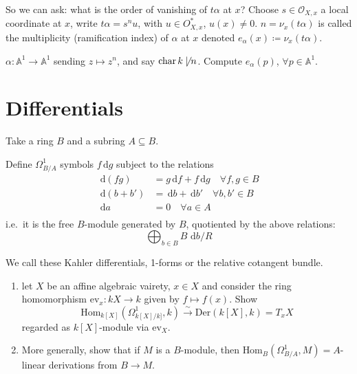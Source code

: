 \documentclass{article}
\newcommand{\A}{\mathbb{A}}
\newcommand{\diff}{\,\textrm{d}}
\DeclareMathOperator{\chara}{char}
\begin{document}
So we can ask: what is the order of vanishing of $t\alpha$ at $x$?
Choose $s \in \mathcal{O}_{X, x}$ a local coordinate at $x$, write $t\alpha = s^n u$, with $u \in O_{X, x}^*$, $u(x) \neq 0$.
$n = \nu_x(t \alpha)$ is called the multiplicity (ramification index) of $\alpha$ at $x$ denoted $e_\alpha(x) \coloneqq \nu_x(t\alpha)$.
\begin{eg}
    $\alpha: \A^1 \to \A^1$ sending $z \mapsto z^n$, and say $\chara k \not\mid n$. Compute $e_\alpha(p)$, $\forall p \in \A^1$.
\end{eg}

\section{Differentials}
Take a ring $B$ and a subring $A \subseteq B$.
\begin{defi}
    Define $\Omega_{B/A}^1$ symbols $f \diff g$ subject to the relations
    \begin{align*}
        \diff(fg) &= g \diff f + f \diff g \quad \forall f, g \in B\\
        \diff(b + b') &= \diff b + \diff b' \quad \forall b, b' \in B\\
        \diff a &= 0 \quad \forall a \in A \\
    \end{align*}
    i.e.\ it is the free $B$-module generated by $B$, quotiented by the above relations:
    \begin{equation*}
        \bigoplus_{b \in B} B \, \diff b / R
    \end{equation*}

    We call these Kahler differentials, 1-forms or the relative cotangent bundle.
\end{defi}
\begin{ex}
    \leavevmode
    \begin{enumerate}[label=(\alph*)]
        \item let $X$ be an affine algebraic vairety, $x \in X$ and consider the ring homomorphism $\text{ev}_x: k{X} \to k$ given by $f \mapsto f(x)$.
            Show
            \begin{equation*}
                \text{Hom}_{k[X]}(\Omega^1_{k[X]/k]}, k) \xrightarrow{\sim} \text{Der}(k[X], k) = T_x X
            \end{equation*}
            regarded as $k[X]$-module via $\text{ev}_X$.

        \item More generally, show that if
            $M$ is a $B$-module, then $\text{Hom}_B(\Omega^1_{B/A}, M) = A$-linear derivations from $B \to M$.
    \end{enumerate}
\end{ex}
\end{document}
